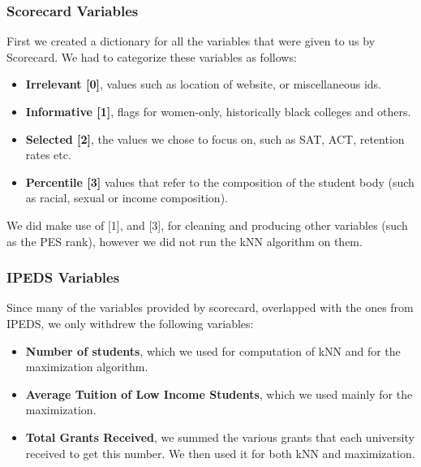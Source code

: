 \documentclass[12pt]{scrartcl}
\begin{document}
		\subsubsection{Scorecard Variables}
			First we created a dictionary for all the variables that were given to us by Scorecard. We had to categorize these variables as follows:
			\begin{itemize}
				\item \textbf{Irrelevant [0]}, values such as location of website, or miscellaneous ids.
				\item \textbf{Informative [1]}, flags for women-only, historically black colleges and others. 
				\item \textbf{Selected [2]}, the values we chose to focus on, such as SAT, ACT, retention rates etc. 
				\item \textbf{Percentile [3]} values that refer to the composition of the student body (such as racial, sexual or income composition).
			\end{itemize}
			We did make use of [1], and [3], for cleaning and producing other variables (such as the PES rank), however we did not run the kNN algorithm on them.

		\subsubsection{IPEDS Variables}
			Since many of the variables provided by scorecard, overlapped with the ones from IPEDS, we only withdrew the following variables:
			\begin{itemize}
				\item \textbf{Number of students}, which we used for computation of kNN and for the maximization algorithm.
				\item \textbf{Average Tuition of Low Income Students}, which we used mainly for the maximization.
				\item \textbf{Total Grants Received}, we summed the various grants that each university received to get this number. We then used it for both kNN and maximization.
			\end{itemize}
	
\end{document}
